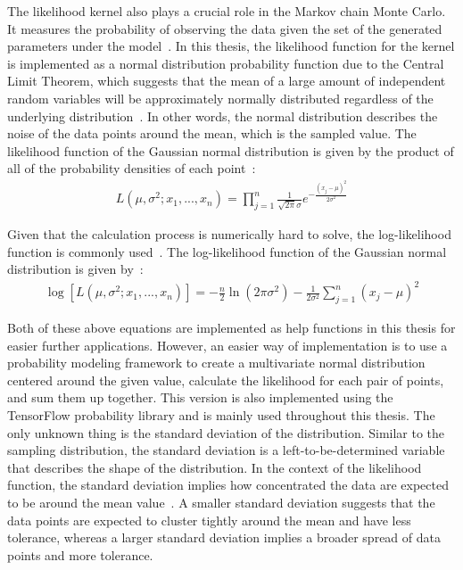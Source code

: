 The likelihood kernel also plays a crucial role in the Markov chain Monte Carlo. It measures the probability of observing the data given the set of the generated parameters under the model~\cite{likelihood_general}. In this thesis, the likelihood function for the kernel is implemented as a normal distribution probability function due to the Central Limit Theorem, which suggests that the mean of a large amount of independent random variables will be approximately normally distributed regardless of the underlying distribution~\cite{central_limit_theorem}. In other words, the normal distribution describes the noise of the data points around the mean, which is the sampled value. The likelihood function of the Gaussian normal distribution is given by the product of all of the probability densities of each point~\cite{gaussian_likelihood}:
\begin{align}
    L(\mu, \sigma^2; x_1, ..., x_n) = \prod_{j=1}^n \frac{1}{\sqrt{2\pi}\sigma} e^{-\frac{(x_j-\mu)^2}{2\sigma^2}}
\end{align}

Given that the calculation process is numerically hard to solve, the log-likelihood function is commonly used~\cite{log_likelihood}. The log-likelihood function of the Gaussian normal distribution is given by~\cite{log_gaussian_likelihood}:
\begin{align}
    \log[L(\mu, \sigma^2; x_1, ..., x_n)] = -\frac n 2\ln(2\pi\sigma^2) - \frac 1 {2\sigma^2}\sum_{j=1}^n (x_j - \mu)^2
\end{align}
 
Both of these above equations are implemented as help functions in this thesis for easier further applications. However, an easier way of implementation is to use a probability modeling framework to create a multivariate normal distribution centered around the given value, calculate the likelihood for each pair of points, and sum them up together. This version is also implemented using the TensorFlow probability library and is mainly used throughout this thesis. The only unknown thing is the standard deviation of the distribution. Similar to the sampling distribution, the standard deviation is a left-to-be-determined variable that describes the shape of the distribution. In the context of the likelihood function, the standard deviation implies how concentrated the data are expected to be around the mean value~\cite{standard_deviation_estimation}. A smaller standard deviation suggests that the data points are expected to cluster tightly around the mean and have less tolerance, whereas a larger standard deviation implies a broader spread of data points and more tolerance. 

